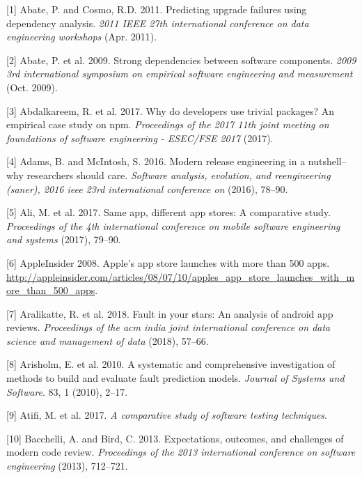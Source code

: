 \documentclass[]{book}
\begin{document}
\hypertarget{refs}{}
\hypertarget{ref-Abate2011}{}
{[}1{]} Abate, P. and Cosmo, R.D. 2011. Predicting upgrade failures
using dependency analysis. \emph{2011 IEEE 27th international conference
on data engineering workshops} (Apr. 2011).

\hypertarget{ref-Abate2009}{}
{[}2{]} Abate, P. et al. 2009. Strong dependencies between software
components. \emph{2009 3rd international symposium on empirical software
engineering and measurement} (Oct. 2009).

\hypertarget{ref-Abdalkareem2017}{}
{[}3{]} Abdalkareem, R. et al. 2017. Why do developers use trivial
packages? An empirical case study on npm. \emph{Proceedings of the 2017
11th joint meeting on foundations of software engineering - ESEC/FSE
2017} (2017).

\hypertarget{ref-adams2016a}{}
{[}4{]} Adams, B. and McIntosh, S. 2016. Modern release engineering in a
nutshell--why researchers should care. \emph{Software analysis,
evolution, and reengineering (saner), 2016 ieee 23rd international
conference on} (2016), 78--90.

\hypertarget{ref-ali2017same}{}
{[}5{]} Ali, M. et al. 2017. Same app, different app stores: A
comparative study. \emph{Proceedings of the 4th international conference
on mobile software engineering and systems} (2017), 79--90.

\hypertarget{ref-appStoreLaunch}{}
{[}6{]} AppleInsider 2008. Apple's app store launches with more than 500
apps.
\url{http://appleinsider.com/articles/08/07/10/apples_app_store_launches_with_more_than_500_apps}.

\hypertarget{ref-aralikatte2018fault}{}
{[}7{]} Aralikatte, R. et al. 2018. Fault in your stars: An analysis of
android app reviews. \emph{Proceedings of the acm india joint
international conference on data science and management of data} (2018),
57--66.

\hypertarget{ref-Arisholm2010}{}
{[}8{]} Arisholm, E. et al. 2010. A systematic and comprehensive
investigation of methods to build and evaluate fault prediction models.
\emph{Journal of Systems and Software}. 83, 1 (2010), 2--17.

\hypertarget{ref-atifi2017}{}
{[}9{]} Atifi, M. et al. 2017. \emph{A comparative study of software
testing techniques}.

\hypertarget{ref-bacchelli2013expectations}{}
{[}10{]} Bacchelli, A. and Bird, C. 2013. Expectations, outcomes, and
challenges of modern code review. \emph{Proceedings of the 2013
international conference on software engineering} (2013), 712--721.
\end{document}
